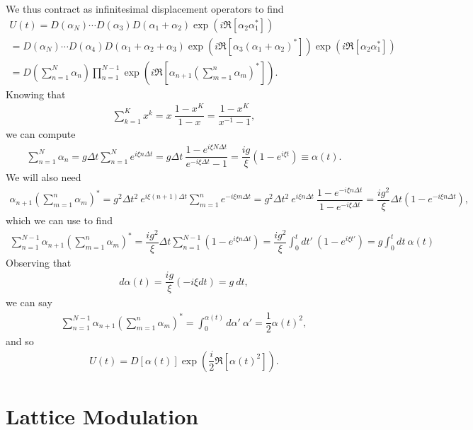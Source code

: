 \documentclass[aps,notitlepage,nofootinbib,10pt]{revtex4-1}
\newcommand{\f}[2]{\dfrac{#1}{#2}} %
\newcommand{\p}[1]{\left(#1\right)} %
\renewcommand{\sp}[1]{\left[#1\right]} %
\newcommand{\1}{\mathds{1}}
\begin{document}
We thus contract as infinitesimal displacement operators to find
\begin{multline}
  U\p{t}
  = D\p{\alpha_N}\cdots D\p{\alpha_3}D\p{\alpha_1+\alpha_2}
  \exp\p{i\Re\sp{\alpha_2\alpha_1^*}} \\
  = D\p{\alpha_N}\cdots D\p{\alpha_4}D\p{\alpha_1+\alpha_2+\alpha_3}
  \exp\p{i\Re\sp{\alpha_3\p{\alpha_1+\alpha_2}^*}}
  \exp\p{i\Re\sp{\alpha_2\alpha_1^*}} \\
  = D\p{\sum_{n=1}^N\alpha_n} \prod_{n=1}^{N-1}
  \exp\p{i\Re\sp{\alpha_{n+1}\p{\sum_{m=1}^n\alpha_m}^*}}.
\end{multline}
Knowing that
\begin{align}
  \sum_{k=1}^K x^k = x~\f{1-x^K}{1-x} = \f{1-x^K}{x^{-1}-1},
\end{align}
we can compute
\begin{align}
  \sum_{n=1}^N\alpha_n
  = g\Delta t\sum_{n=1}^N e^{i\xi n\Delta t}
  = g\Delta t~\f{1-e^{i\xi N\Delta t}}{e^{-i\xi\Delta t}-1}
  = \f{ig}{\xi}\p{1-e^{i\xi t}}
  \equiv \alpha\p{t}.
\end{align}
We will also need
\begin{align}
  \alpha_{n+1}\p{\sum_{m=1}^n\alpha_m}^*
  = g^2\Delta t^2~e^{i\xi\p{n+1}\Delta t}\sum_{m=1}^ne^{-i\xi m\Delta t}
  = g^2\Delta t^2~e^{i\xi n\Delta t}~
  \f{1-e^{-i\xi n\Delta t}}{1-e^{-i\xi\Delta t}}
  = \f{ig^2}{\xi}\Delta t\p{1-e^{-i\xi n\Delta t}},
\end{align}
which we can use to find
\begin{align}
  \sum_{n=1}^{N-1}\alpha_{n+1}\p{\sum_{m=1}^n\alpha_m}^*
  = \f{ig^2}{\xi}\Delta t\sum_{n=1}^{N-1}\p{1-e^{i\xi n\Delta t}}
  = \f{ig^2}{\xi}\int_0^t dt'~\p{1-e^{i\xi t'}}
  = g\int_0^t dt~\alpha\p{t}
\end{align}
Observing that
\begin{align}
  d\alpha\p{t} = \f{ig}{\xi}\p{-i\xi dt} = g~dt,
\end{align}
we can say
\begin{align}
  \sum_{n=1}^{N-1}\alpha_{n+1}\p{\sum_{m=1}^n\alpha_m}^*
  = \int_0^{\alpha\p{t}} d\alpha'~\alpha'
  = \f12\alpha\p{t}^2,
\end{align}
and so
\begin{align}
  U\p{t} = D\sp{\alpha\p{t}} \exp\p{\f{i}{2}\Re\sp{\alpha\p{t}^2}}.
\end{align}


\newpage


\section{Lattice Modulation}
\end{document}
